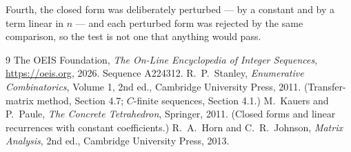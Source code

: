 \documentclass[11pt,a4paper]{article}
\theoremstyle{plain}
\theoremstyle{definition}
\begin{document}
Fourth, the closed form was deliberately perturbed --- by a constant and by a term linear in
$n$ --- and each perturbed form was rejected by the same comparison, so the test is not one
that anything would pass.

\begin{thebibliography}{9}
 The OEIS Foundation, \emph{The On-Line Encyclopedia of Integer
Sequences}, \url{https://oeis.org}, 2026. Sequence A224312.
 R.~P.~Stanley, \emph{Enumerative Combinatorics}, Volume 1, 2nd ed.,
Cambridge University Press, 2011. (Transfer-matrix method, Section 4.7; $C$-finite sequences,
Section 4.1.)
 M.~Kauers and P.~Paule, \emph{The Concrete Tetrahedron}, Springer, 2011.
(Closed forms and linear recurrences with constant coefficients.)
 R.~A.~Horn and C.~R.~Johnson, \emph{Matrix Analysis}, 2nd ed., Cambridge
University Press, 2013.
\end{thebibliography}
\end{document}
